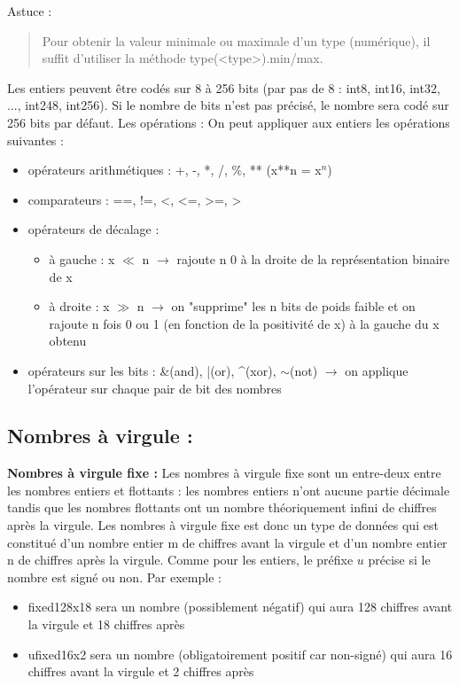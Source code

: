 \documentclass{article}
\begin{document}
\noindent Astuce :
\begin{quote}
    Pour obtenir la valeur minimale ou maximale d'un type (numérique), il suffit d'utiliser la méthode type(<type>).min/max. 
\end{quote}

Les entiers peuvent être codés sur 8 à 256 bits (par pas de 8 : int8, int16, int32, ..., int248, int256). Si le nombre de bits n'est pas précisé, le nombre sera codé sur 256 bits par défaut. \newline \newline
Les opérations :
On peut appliquer aux entiers les opérations suivantes :
\begin{itemize}
    \item opérateurs arithmétiques : +, -, *, /, \%, ** (x**n = x$^{n}$)
    \item comparateurs : ==, !=, <, <=, >=, >
    \item opérateurs de décalage :
    \begin{itemize}
        \item à gauche : x $\ll$ n $\rightarrow$ rajoute n 0 à la droite de la représentation binaire de x
        \item à droite : x $\gg$ n $\rightarrow$ on "supprime" les n bits de poids faible et on rajoute n fois 0 ou 1 (en fonction de la positivité de x) à la gauche du x obtenu
    \end{itemize}
    \item opérateurs sur les bits : \&(and), |(or), \^{}(xor), $\sim$(not) $\rightarrow$ on applique l'opérateur sur chaque pair de bit des nombres
\end{itemize}

\subsection{Nombres à virgule :}
\textbf{Nombres à virgule fixe :}\newline
Les nombres à virgule fixe sont un entre-deux entre les nombres entiers et flottants : les nombres entiers n'ont aucune partie décimale tandis que les nombres flottants ont un nombre théoriquement infini de chiffres après la virgule. Les nombres à virgule fixe est donc un type de données qui est constitué d'un nombre entier m de chiffres avant la virgule et d'un nombre entier n de chiffres après la virgule. Comme pour les entiers, le préfixe $u$ précise si le nombre est signé ou non. Par exemple :
\begin{itemize}
    \item fixed128x18 sera un nombre (possiblement négatif) qui aura 128 chiffres avant la virgule et 18 chiffres après
    \item ufixed16x2 sera un nombre (obligatoirement positif car non-signé) qui aura 16 chiffres avant la virgule et 2 chiffres après
\end{itemize}
\end{document}
